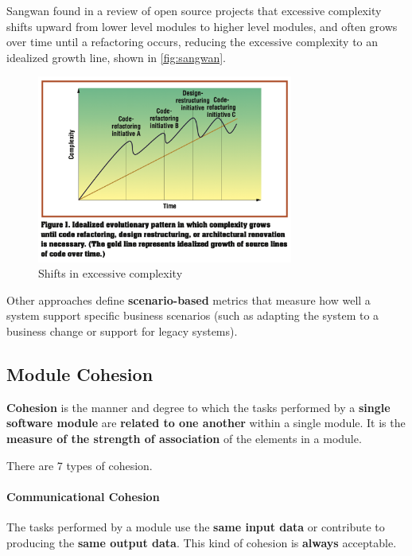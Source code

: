 Sangwan found in a review of open source projects that excessive complexity shifts upward from lower level modules to higher level modules, and often grows over time until a refactoring occurs, reducing the excessive complexity to an idealized growth line, shown in \autoref{fig:sangwan}.

\begin{figure}[htbp]
	\centering
	\includegraphics[width=0.75\textwidth]{images/sangwan.png}
	\caption{Shifts in excessive complexity}
	\label{fig:sangwan}
\end{figure}

Other approaches define \textbf{scenario-based} metrics that measure how well a system support specific business scenarios (such as adapting the system to a business change or support for legacy systems).


\subsection{Module Cohesion}
\textbf{Cohesion} is the manner and degree to which the tasks performed by a \textbf{single software module} are \textbf{related to one another} within a single module. It is the \textbf{measure of the strength of association} of the elements in a module. 

There are 7 types of cohesion.

\paragraph{Communicational Cohesion} %
\label{par:communicational_cohesion}
The tasks performed by a module use the \textbf{same input data} or contribute to producing the \textbf{same output data}.
This kind of cohesion is \textbf{always} acceptable.

